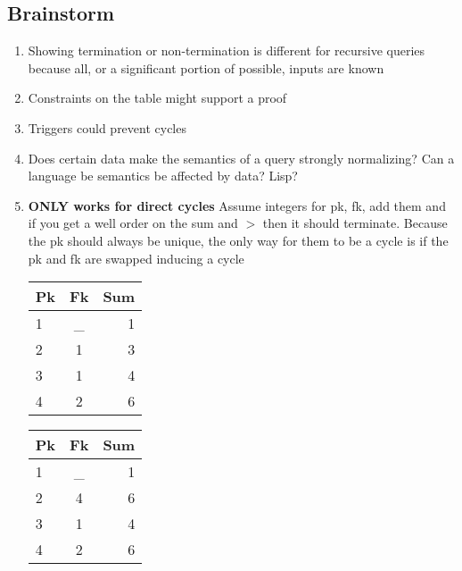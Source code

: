 \documentclass[12pt]{article}
\begin{document}
\subsection{Brainstorm}
\begin{enumerate}
  \item Showing termination or non-termination is different for recursive queries because all, or a significant portion of possible, inputs are known
  \item Constraints on the table might support a proof
  \item Triggers could prevent cycles
  \item Does certain data make the semantics of a query strongly normalizing? Can a language be semantics be affected by data? Lisp?
  \item \textbf{ONLY works for direct cycles} Assume integers for pk, fk, add them and if you get a well order on the sum and $>$ then it should terminate. Because the pk should always be unique, the only way for them to be a cycle is if the pk and fk are swapped inducing a cycle \\

    \begin{tabular}{| l | c || r |}
      \hline
      Pk & Fk & Sum \\
      \hline
      1 & _ & 1 \\
      2 & 1 & 3 \\
      3 & 1 & 4 \\
      4 & 2 & 6 \\
      \hline
    \end{tabular}

    \begin{tabular}{| l | c || r |}
      \hline
      Pk & Fk & Sum \\
      \hline
      1 & _ & 1 \\
      2 & 4 & 6 \\
      3 & 1 & 4 \\
      4 & 2 & 6 \\
      \hline
    \end{tabular} \\


\end{enumerate}
\end{document}
